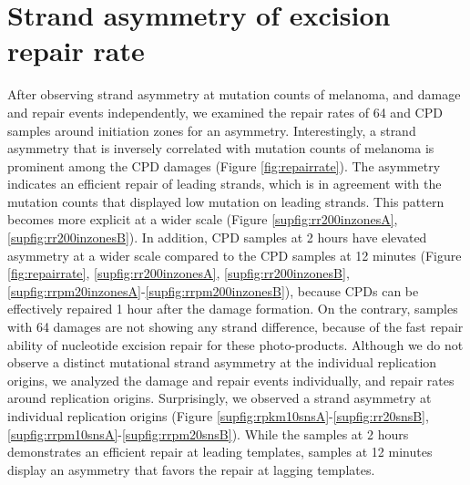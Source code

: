 \section{Strand asymmetry of excision repair rate}

After observing strand asymmetry at mutation counts of melanoma, and damage and repair events independently, we examined the repair rates of \gls{64} and \gls{CPD} samples around initiation zones for an asymmetry. Interestingly, a strand asymmetry that is inversely correlated with mutation counts of melanoma is prominent among the \gls{CPD} damages (Figure \ref{fig:repairrate}). The asymmetry indicates an efficient repair of leading strands, which is in agreement with the mutation counts that displayed low mutation on leading strands. This pattern becomes more explicit at a wider scale (Figure \ref{supfig:rr200inzonesA}, \ref{supfig:rr200inzonesB}). In addition, \gls{CPD} samples at 2 hours have elevated asymmetry at a wider scale compared to the \gls{CPD} samples at 12 minutes (Figure \ref{fig:repairrate}, \ref{supfig:rr200inzonesA}, \ref{supfig:rr200inzonesB}, \ref{supfig:rrpm20inzonesA}-\ref{supfig:rrpm200inzonesB}), because \gls{CPD}s can be effectively repaired 1 hour after the damage formation. On the contrary, samples with \gls{64} damages are not showing any strand difference, because of the fast repair ability of nucleotide excision repair for these photo-products. Although we do not observe a distinct mutational strand asymmetry at the individual replication origins, we analyzed the damage and repair events individually, and repair rates around replication origins. Surprisingly, we observed a strand asymmetry at individual replication origins (Figure \ref{supfig:rpkm10snsA}-\ref{supfig:rr20snsB}, \ref{supfig:rrpm10snsA}-\ref{supfig:rrpm20snsB}). While the samples at 2 hours demonstrates an efficient repair at leading templates, samples at 12 minutes display an asymmetry that favors the repair at lagging templates. 


